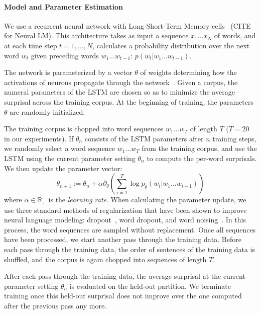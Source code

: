\documentclass[11pt,letterpaper]{article}
\begin{document}
\paragraph{Model and Parameter Estimation}
We use a recurrent neural network with Long-Short-Term Memory cells~\citep{hochreiter-long-1997} (CITE for Neural LM).
This architecture takes as input a sequence $x_1 ... x_N$ of words, and at each time step $t=1, ..., N$, calculates a probability distribution over the next word $w_{t}$ given preceding words $w_1 ... w_{t-1}$: $p(w_t|w_1...w_{t-1})$.

The network is parameterized by a vector $\theta$ of weights determining how the activations of neurons propagate through the network~\citep{hochreiter-long-1997}.
Given a corpus, the numeral parameters of the LSTM are chosen so as to minimize the average surprisal across the training corpus.
At the beginning of training, the parameters $\theta$ are randomly initialized.

The training corpus is chopped into word sequences $w_1 ... w_T$ of length $T$ ($T = 20$ in our experiments).
If $\theta_n$ consists of the LSTM parameters after $n$ training steps, we randomly select a word sequence $w_1 ... w_T$ from the training corpus, and use the LSTM using the current parameter setting $\theta_n$ to compute the per-word surprisals.
We then update the parameter vector:
\begin{equation}\label{eq:train}
	\theta_{n+1} := \theta_n + \alpha \partial_\theta \left(\sum_{i=1}^T \log p_\theta(w_i|w_1...w_{i-1})\right)
\end{equation}
where $\alpha \in \mathbb{R}_+$ is the \emph{learning rate}.
When calculating the parameter update, we use three standard methods of regularization that have been shown to improve neural language modeling: dropout~\citep{srivastava-dropout:-2014}, word dropout, and word noising~\citep{xie2017data}.
In this process, the word sequences are sampled without replacement.
Once all sequences have been processed, we start another pass through the training data.
Before each pass through the training data, the order of sentences of the training data is shuffled, and the corpus is again chopped into sequences of length $T$.

After each pass through the training data, the average surprisal at the current parameter setting $\theta_n$ is evaluated on the held-out partition.
We terminate training once this held-out  surprisal does not improve over the one computed after the previous pass any more.
\end{document}

